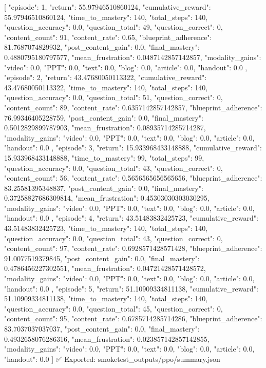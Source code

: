 [
  {
    "episode": 1,
    "return": 55.97946510860124,
    "cumulative_reward": 55.97946510860124,
    "time_to_mastery": 140,
    "total_steps": 140,
    "question_accuracy": 0.0,
    "question_total": 49,
    "question_correct": 0,
    "content_count": 91,
    "content_rate": 0.65,
    "blueprint_adherence": 81.7687074829932,
    "post_content_gain": 0.0,
    "final_mastery": 0.4880795180797577,
    "mean_frustration": 0.0487142857142857,
    "modality_gains": {
      "video": 0.0,
      "PPT": 0.0,
      "text": 0.0,
      "blog": 0.0,
      "article": 0.0,
      "handout": 0.0
    }
  },
  {
    "episode": 2,
    "return": 43.47680050113322,
    "cumulative_reward": 43.47680050113322,
    "time_to_mastery": 140,
    "total_steps": 140,
    "question_accuracy": 0.0,
    "question_total": 51,
    "question_correct": 0,
    "content_count": 89,
    "content_rate": 0.6357142857142857,
    "blueprint_adherence": 76.99346405228759,
    "post_content_gain": 0.0,
    "final_mastery": 0.5012829899787903,
    "mean_frustration": 0.08935714285714287,
    "modality_gains": {
      "video": 0.0,
      "PPT": 0.0,
      "text": 0.0,
      "blog": 0.0,
      "article": 0.0,
      "handout": 0.0
    }
  },
  {
    "episode": 3,
    "return": 15.933968433148888,
    "cumulative_reward": 15.933968433148888,
    "time_to_mastery": 99,
    "total_steps": 99,
    "question_accuracy": 0.0,
    "question_total": 43,
    "question_correct": 0,
    "content_count": 56,
    "content_rate": 0.5656565656565656,
    "blueprint_adherence": 83.25581395348837,
    "post_content_gain": 0.0,
    "final_mastery": 0.37258827686309814,
    "mean_frustration": 0.45303030303030295,
    "modality_gains": {
      "video": 0.0,
      "PPT": 0.0,
      "text": 0.0,
      "blog": 0.0,
      "article": 0.0,
      "handout": 0.0
    }
  },
  {
    "episode": 4,
    "return": 43.51483832425723,
    "cumulative_reward": 43.51483832425723,
    "time_to_mastery": 140,
    "total_steps": 140,
    "question_accuracy": 0.0,
    "question_total": 43,
    "question_correct": 0,
    "content_count": 97,
    "content_rate": 0.6928571428571428,
    "blueprint_adherence": 91.0077519379845,
    "post_content_gain": 0.0,
    "final_mastery": 0.4786456227302551,
    "mean_frustration": 0.04721428571428572,
    "modality_gains": {
      "video": 0.0,
      "PPT": 0.0,
      "text": 0.0,
      "blog": 0.0,
      "article": 0.0,
      "handout": 0.0
    }
  },
  {
    "episode": 5,
    "return": 51.10909334811138,
    "cumulative_reward": 51.10909334811138,
    "time_to_mastery": 140,
    "total_steps": 140,
    "question_accuracy": 0.0,
    "question_total": 45,
    "question_correct": 0,
    "content_count": 95,
    "content_rate": 0.6785714285714286,
    "blueprint_adherence": 83.7037037037037,
    "post_content_gain": 0.0,
    "final_mastery": 0.4932658076286316,
    "mean_frustration": 0.023857142857142855,
    "modality_gains": {
      "video": 0.0,
      "PPT": 0.0,
      "text": 0.0,
      "blog": 0.0,
      "article": 0.0,
      "handout": 0.0
    }
  }
]
✅ Exported: smoketest_outputs/ppo/summary.json

